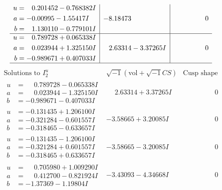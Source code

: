 \documentclass[1p]{elsarticle_modified}
\theoremstyle{definition}
\newcommand{\I}{\sqrt{-1}}
\begin{document}
$$\begin{array}{c|c|c}
\begin{aligned}
u &= \phantom{-}0.201452 - 0.768382 I \\
a &= -0.00995 - 1.55417 I \\
b &= \phantom{-}1.130110 - 0.779101 I\end{aligned}
 & -8.18473\phantom{ +0.000000I} & \phantom{-0.000000 } 0 \\ \hline\begin{aligned}
u &= \phantom{-}0.789728 + 0.065338 I \\
a &= \phantom{-}0.023944 + 1.325150 I \\
b &= -0.989671 + 0.407033 I\end{aligned}
 & \phantom{-}2.63314 - 3.37265 I & \phantom{-0.000000 } 0\\
 \hline 
 \end{array}$$\newpage$$\begin{array}{c|c|c}  
\text{Solutions to }I^u_{2}& \I (\text{vol} + \sqrt{-1}CS) & \text{Cusp shape}\\
 \hline 
\begin{aligned}
u &= \phantom{-}0.789728 - 0.065338 I \\
a &= \phantom{-}0.023944 - 1.325150 I \\
b &= -0.989671 - 0.407033 I\end{aligned}
 & \phantom{-}2.63314 + 3.37265 I & \phantom{-0.000000 } 0 \\ \hline\begin{aligned}
u &= -0.131435 + 1.206100 I \\
a &= -0.321284 - 0.601557 I \\
b &= -0.318465 - 0.633657 I\end{aligned}
 & -3.58665 + 3.20085 I & \phantom{-0.000000 } 0 \\ \hline\begin{aligned}
u &= -0.131435 - 1.206100 I \\
a &= -0.321284 + 0.601557 I \\
b &= -0.318465 + 0.633657 I\end{aligned}
 & -3.58665 - 3.20085 I & \phantom{-0.000000 } 0 \\ \hline\begin{aligned}
u &= \phantom{-}0.705980 + 1.009290 I \\
a &= \phantom{-}0.412700 - 0.821924 I \\
b &= -1.37369 - 1.19804 I\end{aligned}
 & -3.43093 - 4.34668 I & \phantom{-0.000000 } 0 \\ \hline\begin{aligned}

\end{aligned}
\end{array}$$
\end{document}
